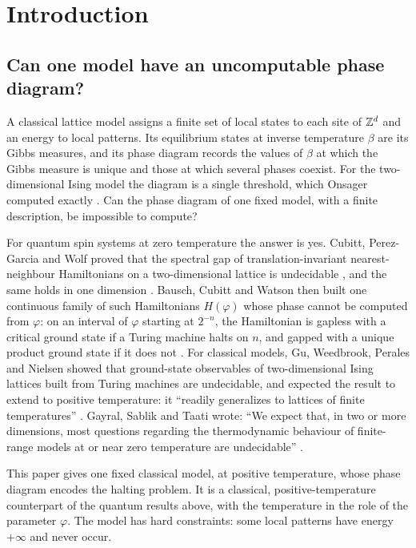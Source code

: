\section{Introduction}\label{sec:intro}

\subsection{Can one model have an uncomputable phase diagram?}

A classical lattice model assigns a finite set of local states to each site of $\mathbb{Z}^d$ and an energy to local patterns. Its equilibrium states at inverse temperature $\beta$ are its Gibbs measures, and its phase diagram records the values of $\beta$ at which the Gibbs measure is unique and those at which several phases coexist. For the two-dimensional Ising model the diagram is a single threshold, which Onsager computed exactly \cite{Onsager44}. Can the phase diagram of one fixed model, with a finite description, be impossible to compute?

For quantum spin systems at zero temperature the answer is yes. Cubitt, Perez-Garcia and Wolf proved that the spectral gap of translation-invariant nearest-neighbour Hamiltonians on a two-dimensional lattice is undecidable \cite{CPGW15,CPGW22}, and the same holds in one dimension \cite{BCLPG20}. Bausch, Cubitt and Watson then built one continuous family of such Hamiltonians $H(\varphi)$ whose phase cannot be computed from $\varphi$: on an interval of $\varphi$ starting at $2^{-n}$, the Hamiltonian is gapless with a critical ground state if a Turing machine halts on $n$, and gapped with a unique product ground state if it does not \cite{BCW21}. For classical models, Gu, Weedbrook, Perales and Nielsen showed that ground-state observables of two-dimensional Ising lattices built from Turing machines are undecidable, and expected the result to extend to positive temperature: it ``readily generalizes to lattices of finite temperatures'' \cite{GWPN09}. Gayral, Sablik and Taati wrote: ``We expect that, in two or more dimensions, most questions regarding the thermodynamic behaviour of finite-range models at or near zero temperature are undecidable'' \cite{GST25}.

This paper gives one fixed classical model, at positive temperature, whose phase diagram encodes the halting problem. It is a classical, positive-temperature counterpart of the quantum results above, with the temperature in the role of the parameter $\varphi$. The model has hard constraints: some local patterns have energy $+\infty$ and never occur.

